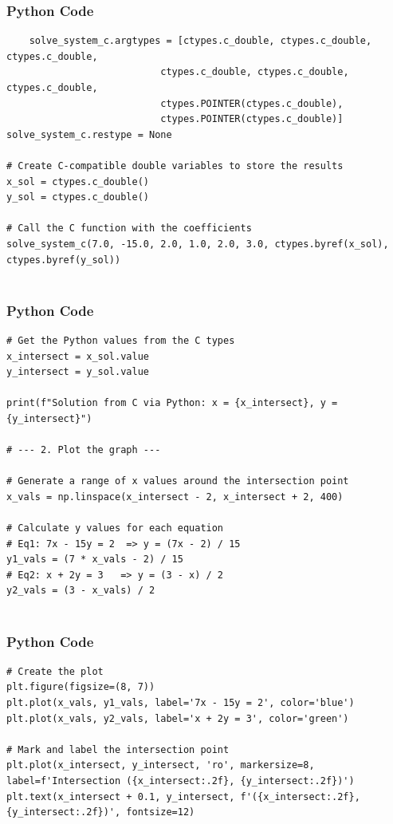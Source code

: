 \documentclass{beamer}
\begin{document}
\begin{frame}[fragile]
    \frametitle{Python Code}
    \begin{lstlisting}
    solve_system_c.argtypes = [ctypes.c_double, ctypes.c_double, ctypes.c_double, 
                           ctypes.c_double, ctypes.c_double, ctypes.c_double,
                           ctypes.POINTER(ctypes.c_double), 
                           ctypes.POINTER(ctypes.c_double)]
solve_system_c.restype = None

# Create C-compatible double variables to store the results
x_sol = ctypes.c_double()
y_sol = ctypes.c_double()

# Call the C function with the coefficients
solve_system_c(7.0, -15.0, 2.0, 1.0, 2.0, 3.0, ctypes.byref(x_sol), ctypes.byref(y_sol))


    \end{lstlisting}
\end{frame}

\begin{frame}[fragile]
    \frametitle{Python Code}
    \begin{lstlisting}
# Get the Python values from the C types
x_intersect = x_sol.value
y_intersect = y_sol.value

print(f"Solution from C via Python: x = {x_intersect}, y = {y_intersect}")

# --- 2. Plot the graph ---

# Generate a range of x values around the intersection point
x_vals = np.linspace(x_intersect - 2, x_intersect + 2, 400)

# Calculate y values for each equation
# Eq1: 7x - 15y = 2  => y = (7x - 2) / 15
y1_vals = (7 * x_vals - 2) / 15
# Eq2: x + 2y = 3   => y = (3 - x) / 2
y2_vals = (3 - x_vals) / 2


    \end{lstlisting}
\end{frame}

\begin{frame}[fragile]
    \frametitle{Python Code}
    \begin{lstlisting}
# Create the plot
plt.figure(figsize=(8, 7))
plt.plot(x_vals, y1_vals, label='7x - 15y = 2', color='blue')
plt.plot(x_vals, y2_vals, label='x + 2y = 3', color='green')

# Mark and label the intersection point
plt.plot(x_intersect, y_intersect, 'ro', markersize=8, label=f'Intersection ({x_intersect:.2f}, {y_intersect:.2f})')
plt.text(x_intersect + 0.1, y_intersect, f'({x_intersect:.2f}, {y_intersect:.2f})', fontsize=12)


    \end{lstlisting}
\end{frame}
\end{document}
